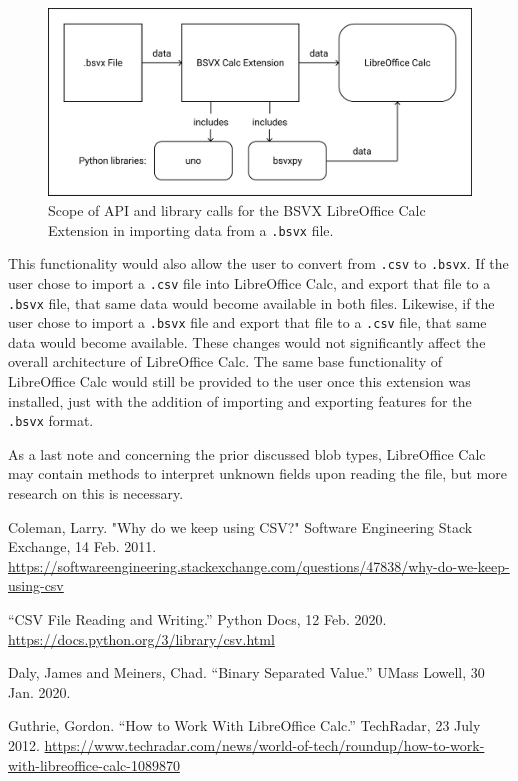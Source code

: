 \documentclass[10pt]{article}
\begin{document}
\begin{figure}[H]
\centering
\includegraphics[width=5in]{figures/bsvxToData.png}
\caption{Scope of API and library calls for the BSVX LibreOffice Calc Extension in importing data from a \texttt{.bsvx} file.}
\label{fig:deliverables_bsvxToData}
\end{figure}

\indent{}
This functionality would also allow the user to convert from \texttt{.csv} to \texttt{.bsvx}.
If the user chose to import a \texttt{.csv} file into LibreOffice Calc, and export that file to a \texttt{.bsvx} file, that same data would become available in both files.
Likewise, if the user chose to import a \texttt{.bsvx} file and export that file to a \texttt{.csv} file, that same data would become available.
These changes would not significantly affect the overall architecture of LibreOffice Calc.
The same base functionality of LibreOffice Calc would still be provided to the user once this extension was installed, just with the addition of importing and exporting features for the \texttt{.bsvx} format.

\indent{}
As a last note and concerning the prior discussed blob types, LibreOffice Calc may contain methods to interpret unknown fields upon reading the file, but more research on this is necessary.

\clearpage
{}
\printnoidxglossary[nonumberlist]

\clearpage
\begin{thebibliography}{9}

    Coleman, Larry.
    "Why do we keep using CSV?"
    Software Engineering Stack Exchange,
    14 Feb. 2011.
    \url{https://softwareengineering.stackexchange.com/questions/47838/why-do-we-keep-using-csv}

    “CSV File Reading and Writing.”
    Python Docs,
    12 Feb. 2020.
    \url{https://docs.python.org/3/library/csv.html}

    Daly, James and Meiners, Chad.
    “Binary Separated Value.”
    UMass Lowell,
    30 Jan. 2020.

    Guthrie, Gordon.
    “How to Work With LibreOffice Calc.”
    TechRadar,
    23 July 2012.
    \url{https://www.techradar.com/news/world-of-tech/roundup/how-to-work-with-libreoffice-calc-1089870}
  
\end{thebibliography}
\end{document}
